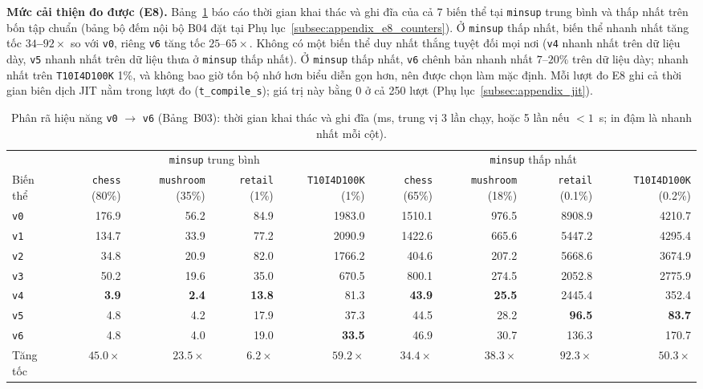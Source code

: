 \textbf{Mức cải thiện đo được (E8).} Bảng~\ref{tab:b03_ablation_time} báo cáo thời gian khai thác và ghi đĩa của cả 7 biến thể tại \texttt{minsup} trung bình và thấp nhất trên bốn tập chuẩn (bảng bộ đếm nội bộ B04 đặt tại Phụ lục~\ref{subsec:appendix_e8_counters}). Ở \texttt{minsup} thấp nhất, biến thể nhanh nhất tăng tốc \textbf{$34$--$92\times$} so với \texttt{v0}, riêng \texttt{v6} tăng tốc $25$--$65\times$. Không có một biến thể duy nhất thắng tuyệt đối mọi nơi (\texttt{v4} nhanh nhất trên dữ liệu dày, \texttt{v5} nhanh nhất trên dữ liệu thưa ở \texttt{minsup} thấp nhất). Ở \texttt{minsup} thấp nhất, \texttt{v6} chênh bản nhanh nhất $7$--$20\%$ trên dữ liệu dày; nhanh nhất trên \texttt{T10I4D100K} 1\%, và không bao giờ tốn bộ nhớ hơn biểu diễn gọn hơn, nên được chọn làm mặc định. Mỗi lượt đo E8 ghi cả thời gian biên dịch JIT nằm trong lượt đo (\texttt{t\_compile\_s}); giá trị này bằng 0 ở cả 250 lượt (Phụ lục~\ref{subsec:appendix_jit}).

\begin{table}[!t]
\centering
\caption{Phân rã hiệu năng \texttt{v0} $\to$ \texttt{v6} (Bảng~B03): thời gian khai thác và ghi đĩa (ms, trung vị 3 lần chạy, hoặc 5 lần nếu $<1$~s; in đậm là nhanh nhất mỗi cột).}
\label{tab:b03_ablation_time}
\scriptsize
\begin{tabular}{@{}lrrrrrrrr@{}}
\toprule
 & \multicolumn{4}{c}{\texttt{minsup} trung bình} & \multicolumn{4}{c}{\texttt{minsup} thấp nhất} \\
\cmidrule(lr){2-5}\cmidrule(l){6-9}
Biến thể & \texttt{chess} (80\%) & \texttt{mushroom} (35\%) & \texttt{retail} (1\%) & \texttt{T10I4D100K} (1\%) & \texttt{chess} (65\%) & \texttt{mushroom} (18\%) & \texttt{retail} (0.1\%) & \texttt{T10I4D100K} (0.2\%) \\
\midrule
\texttt{v0} & 176.9 & 56.2 & 84.9 & 1983.0 & 1510.1 & 976.5 & 8908.9 & 4210.7 \\
\texttt{v1} & 134.7 & 33.9 & 77.2 & 2090.9 & 1422.6 & 665.6 & 5447.2 & 4295.4 \\
\texttt{v2} & 34.8 & 20.9 & 82.0 & 1766.2 & 404.6 & 207.2 & 5668.6 & 3674.9 \\
\texttt{v3} & 50.2 & 19.6 & 35.0 & 670.5 & 800.1 & 274.5 & 2052.8 & 2775.9 \\
\texttt{v4} & \textbf{3.9} & \textbf{2.4} & \textbf{13.8} & 81.3 & \textbf{43.9} & \textbf{25.5} & 2445.4 & 352.4 \\
\texttt{v5} & 4.8 & 4.2 & 17.9 & 37.3 & 44.5 & 28.2 & \textbf{96.5} & \textbf{83.7} \\
\texttt{v6} & 4.8 & 4.0 & 19.0 & \textbf{33.5} & 46.9 & 30.7 & 136.3 & 170.7 \\
\midrule
Tăng tốc & $45.0\times$ & $23.5\times$ & $6.2\times$ & $59.2\times$ & $34.4\times$ & $38.3\times$ & $92.3\times$ & $50.3\times$ \\
\bottomrule
\end{tabular}
\end{table}

